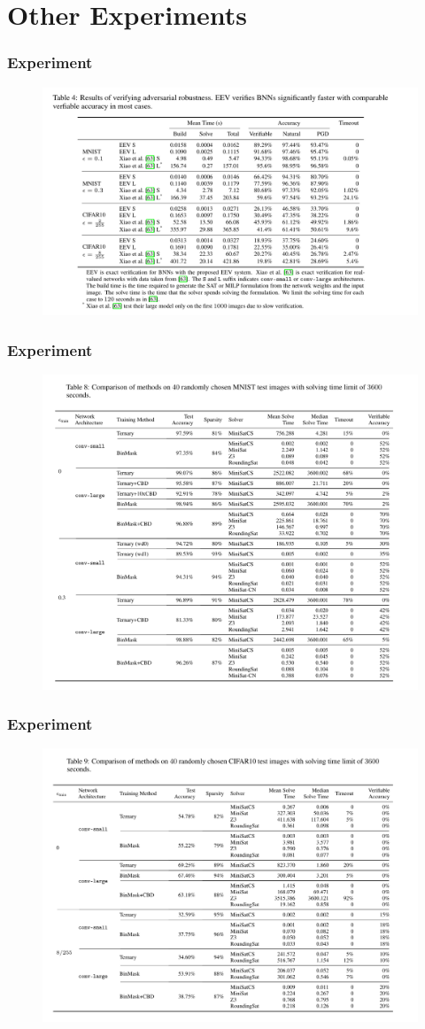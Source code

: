 \documentclass[aspectratio=169%
,serif,mathserif]{beamer}
\begin{document}
\section{Other Experiments}
\begin{frame}
	\frametitle{Experiment}
	\begin{figure}
		\includegraphics[width=0.75\linewidth]{7.png}
	\end{figure}
\end{frame}

\begin{frame}
	\frametitle{Experiment}
	\begin{figure}
		\includegraphics[width=0.75\linewidth]{8.png}
	\end{figure}
\end{frame}

\begin{frame}
	\frametitle{Experiment}
	\begin{figure}
		\includegraphics[width=0.75\linewidth]{9.png}
	\end{figure}
\end{frame}
\end{document}
